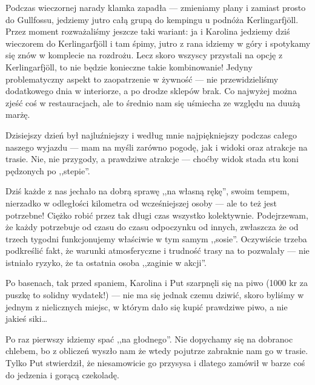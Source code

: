 Podczas wieczornej narady klamka zapadła --- zmieniamy plany i zamiast prosto do Gullfossu, jedziemy jutro całą grupą do kempingu u podnóża Kerlingarfjöll. Przez moment rozważaliśmy jeszcze taki wariant: ja i Karolina jedziemy dziś wieczorem do Kerlingarfjöll i tam śpimy, jutro z rana idziemy w góry i spotykamy się znów w komplecie na rozdrożu. Lecz skoro wszyscy przystali na opcję z Kerlingarfjöll, to nie będzie konieczne takie kombinowanie! Jedyny problematyczny aspekt to zaopatrzenie w żywność --- nie przewidzieliśmy dodatkowego dnia w interiorze, a po drodze sklepów brak. Co najwyżej można zjeść coś w restauracjach, ale to średnio nam się uśmiecha ze względu na duużą marżę.

Dzisiejszy dzień był najluźniejszy i według mnie najpiękniejszy podczas całego naszego wyjazdu --- mam na myśli zarówno pogodę, jak i widoki oraz atrakcje na trasie. Nie, nie przygody, a prawdziwe atrakcje --- choćby widok stada stu koni pędzonych po ,,stepie''.

Dziś każde z nas jechało na dobrą sprawę ,,na własną rękę'', swoim tempem, nierzadko w odległości kilometra od wcześniejszej osoby --- ale to też jest potrzebne! Ciężko robić przez tak długi czas wszystko kolektywnie. Podejrzewam, że każdy potrzebuje od czasu do czasu odpoczynku od innych, zwłaszcza że od trzech tygodni funkcjonujemy właściwie w tym samym ,,sosie''. Oczywiście trzeba podkreślić fakt, że warunki atmosferyczne i trudność trasy na to pozwalały --- nie istniało ryzyko, że ta ostatnia osoba ,,zaginie w akcji''.

Po basenach, tak przed spaniem, Karolina i Put szarpnęli się na piwo (1000 kr za puszkę to solidny wydatek!) --- nie ma się jednak czemu dziwić, skoro byliśmy w jednym z nielicznych miejsc, w którym dało się kupić prawdziwe piwo, a nie jakieś siki…

Po raz pierwszy idziemy spać ,,na głodnego''. Nie dopychamy się na dobranoc chlebem, bo z obliczeń wyszło nam że wtedy pojutrze zabraknie nam go w trasie. Tylko Put stwierdził, że niesamowicie go przysysa i dlatego zamówił w barze coś do jedzenia i gorącą czekoladę.
